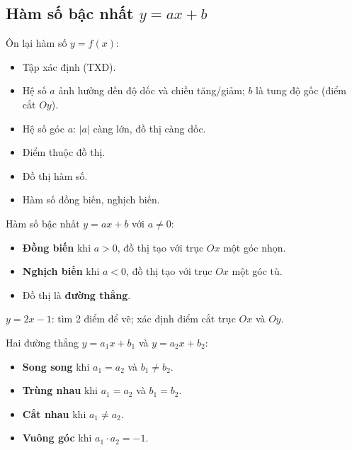 \documentclass[12pt,a4paper]{article}
\begin{document}
\subsection{Hàm số bậc nhất $y = ax + b$}

\begin{dinhnghia}
  Ôn lại hàm số $y = f(x)$:
  \begin{itemize}
    \item Tập xác định (TXĐ).
    \item Hệ số $a$ ảnh hưởng đến độ dốc và chiều tăng/giảm; $b$ là tung độ gốc (điểm cắt $Oy$).
    \item Hệ số góc $a$: $|a|$ càng lớn, đồ thị càng dốc.
    \item Điểm thuộc đồ thị.
    \item Đồ thị hàm số.
    \item Hàm số đồng biến, nghịch biến.

  \end{itemize}
\end{dinhnghia}

\begin{tinhchat}
  Hàm số bậc nhất $y = ax + b$ với $a \neq 0$:
  \begin{itemize}
    \item \textbf{Đồng biến} khi $a > 0$, đồ thị tạo với trục $Ox$ một góc nhọn.
    \item \textbf{Nghịch biến} khi $a < 0$, đồ thị tạo với trục $Ox$ một góc tù.
    \item Đồ thị là \textbf{đường thẳng}.
  \end{itemize}
\end{tinhchat}

\begin{vidu}
  $y = 2x - 1$: tìm 2 điểm để vẽ; xác định điểm cắt trục $Ox$ và $Oy$.
\end{vidu}

\begin{tinhchat}[title={Vị trí tương đối của hai đường thẳng}]
  Hai đường thẳng $y = a_1 x + b_1$ và $y = a_2 x + b_2$:
  \begin{itemize}
    \item \textbf{Song song} khi $a_1 = a_2$ và $b_1 \neq b_2$.
    \item \textbf{Trùng nhau} khi $a_1 = a_2$ và $b_1 = b_2$.
    \item \textbf{Cắt nhau} khi $a_1 \neq a_2$.
    \item \textbf{Vuông góc} khi $a_1 \cdot a_2 = -1$.
  \end{itemize}
\end{tinhchat}
\end{document}
